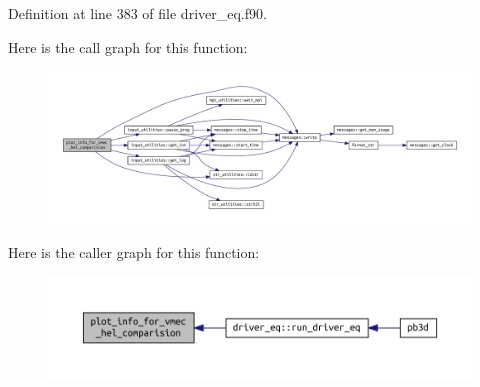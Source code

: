 Definition at line 383 of file driver\+\_\+eq.\+f90.

Here is the call graph for this function\+:
\nopagebreak
\begin{figure}[H]
\begin{center}
\leavevmode
\includegraphics[width=350pt]{driver__eq_8f90_ad281a6a457fca3e46dd9e1ba4de9a632_cgraph}
\end{center}
\end{figure}
Here is the caller graph for this function\+:
\nopagebreak
\begin{figure}[H]
\begin{center}
\leavevmode
\includegraphics[width=350pt]{driver__eq_8f90_ad281a6a457fca3e46dd9e1ba4de9a632_icgraph}
\end{center}
\end{figure}
